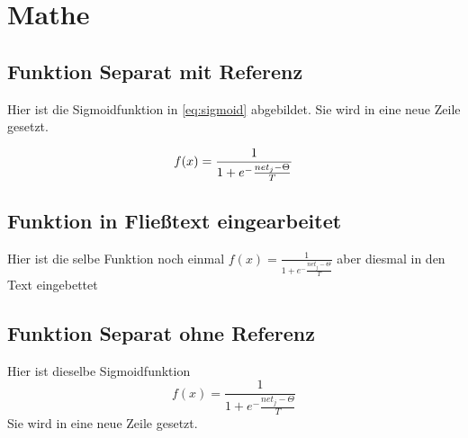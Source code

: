 \chapter{Mathe}
\section{Funktion Separat mit Referenz}

Hier ist die Sigmoidfunktion in \ref{eq:sigmoid} abgebildet. Sie wird in eine neue Zeile gesetzt.

\begin{equation} \label{eq:sigmoid}
    \large
    f(x) = \frac{1}{1+e^-\frac{net_j-\Theta}{T}}
\end{equation}

\section{Funktion in Fließtext eingearbeitet}

Hier ist die selbe Funktion noch einmal \(f(x) = \frac{1}{1+e^-\frac{net_j-\Theta}{T}}\) aber diesmal in den Text eingebettet

\section{Funktion Separat ohne Referenz}

Hier ist dieselbe Sigmoidfunktion \[f(x) = \frac{1}{1+e^-\frac{net_j-\Theta}{T}}\] Sie wird in eine neue Zeile gesetzt.